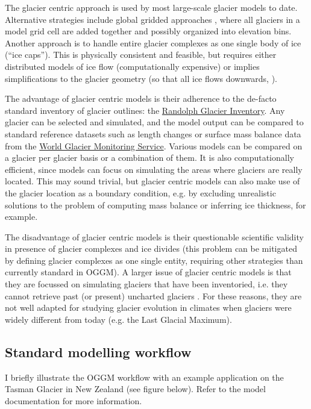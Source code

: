 The glacier centric approach is used by most large-scale glacier models to date. Alternative strategies include global
gridded approaches \citep{Shannon2019}, where all glaciers in a model grid cell are added together and possibly
organized into elevation bins. Another approach is to handle entire glacier complexes as one single body of ice (“ice
caps”). This is physically consistent and feasible, but requires either distributed models of ice flow
\citep{Furst2017} (computationally expensive) or implies simplifications to the glacier geometry (so that all ice flows
downwards, \citep{Huss2012}).

The advantage of glacier centric models is their adherence to the de-facto standard inventory of glacier outlines:
the \href{https://www.glims.org/RGI/}{Randolph Glacier Inventory}. Any glacier can be selected and simulated, and the model
output can be compared to standard reference datasets such as length changes or surface mass balance data from
the \href{https://wgms.ch}{World Glacier Monitoring Service}. Various models can be compared on a glacier per glacier basis
or a combination of them. It is also computationally efficient, since models can focus on simulating the areas where
glaciers are really located. This may sound trivial, but glacier centric models can also make use of the glacier
location as a boundary condition, e.g. by excluding unrealistic solutions to the problem of computing mass balance or
inferring ice thickness, for example.

The disadvantage of glacier centric models is their questionable scientific validity in presence of glacier complexes
and ice divides (this problem can be mitigated by defining glacier complexes as one single entity, requiring other
strategies than currently standard in OGGM). A larger issue of glacier centric models is that they are focussed on
simulating glaciers that have been inventoried, i.e. they cannot retrieve past (or present) uncharted glaciers
\citep{Parkes2018}. For these reasons, they are not well adapted for studying glacier evolution in climates when
glaciers were widely different from today (e.g. the Last Glacial Maximum).


\subsection{Standard modelling workflow}

I briefly illustrate the OGGM workflow with an example application on the Tasman Glacier in New Zealand (see figure
below). Refer to the model documentation for more information.

